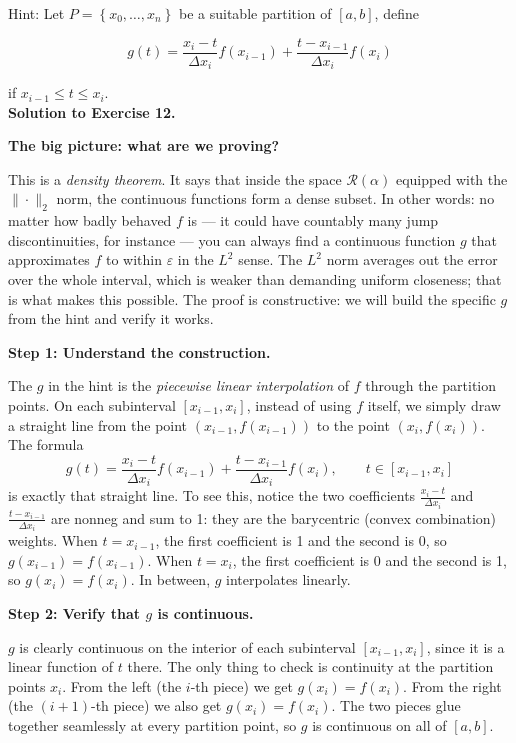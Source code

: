 \documentclass[10pt]{article}
\begin{document}
Hint: Let $P=\left\{x_{0}, \ldots, x_{n}\right\}$ be a suitable partition of $[a, b]$, define

$$
g(t)=\frac{x_{i}-t}{\Delta x_{i}} f\left(x_{i-1}\right)+\frac{t-x_{i-1}}{\Delta x_{i}} f\left(x_{i}\right)
$$

if $x_{i-1} \leq t \leq x_{i}$.\\

\color{red}
\textbf{Solution to Exercise 12.}

\medskip
\textbf{The big picture: what are we proving?}

This is a \emph{density theorem}.
It says that inside the space $\mathscr{R}(\alpha)$ equipped with the $\|\cdot\|_2$ norm, the continuous functions form a dense subset.
In other words: no matter how badly behaved $f$ is --- it could have countably many jump discontinuities, for instance --- you can always find a continuous function $g$ that approximates $f$ to within $\varepsilon$ in the $L^2$ sense.
The $L^2$ norm averages out the error over the whole interval, which is weaker than demanding uniform closeness; that is what makes this possible.
The proof is constructive: we will build the specific $g$ from the hint and verify it works.

\medskip
\textbf{Step 1: Understand the construction.}

The $g$ in the hint is the \emph{piecewise linear interpolation} of $f$ through the partition points.
On each subinterval $[x_{i-1}, x_i]$, instead of using $f$ itself, we simply draw a straight line from the point $(x_{i-1}, f(x_{i-1}))$ to the point $(x_i, f(x_i))$.
The formula
$$g(t) = \frac{x_i - t}{\Delta x_i} f(x_{i-1}) + \frac{t - x_{i-1}}{\Delta x_i} f(x_i), \qquad t \in [x_{i-1}, x_i]$$
is exactly that straight line.
To see this, notice the two coefficients $\frac{x_i - t}{\Delta x_i}$ and $\frac{t - x_{i-1}}{\Delta x_i}$ are nonneg and sum to 1: they are the barycentric (convex combination) weights.
When $t = x_{i-1}$, the first coefficient is 1 and the second is 0, so $g(x_{i-1}) = f(x_{i-1})$.
When $t = x_i$, the first coefficient is 0 and the second is 1, so $g(x_i) = f(x_i)$.
In between, $g$ interpolates linearly.

\medskip
\textbf{Step 2: Verify that $g$ is continuous.}

$g$ is clearly continuous on the interior of each subinterval $[x_{i-1}, x_i]$, since it is a linear function of $t$ there.
The only thing to check is continuity at the partition points $x_i$.
From the left (the $i$-th piece) we get $g(x_i) = f(x_i)$.
From the right (the $(i+1)$-th piece) we also get $g(x_i) = f(x_i)$.
The two pieces glue together seamlessly at every partition point, so $g$ is continuous on all of $[a, b]$.
\end{document}
